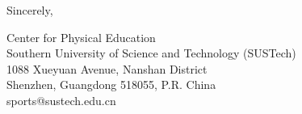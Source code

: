 \documentclass{letter}
\begin{document}
\begin{letter}{}
    \vspace{1cm}
    Sincerely, \\
    \vspace{0.5cm}
    
    Center for Physical Education\\
    Southern University of Science and Technology (SUSTech) \\
    1088 Xueyuan Avenue, Nanshan District \\
    Shenzhen, Guangdong 518055, P.R. China \\
    {sports@sustech.edu.cn}
 
\end{letter}
\end{document}
